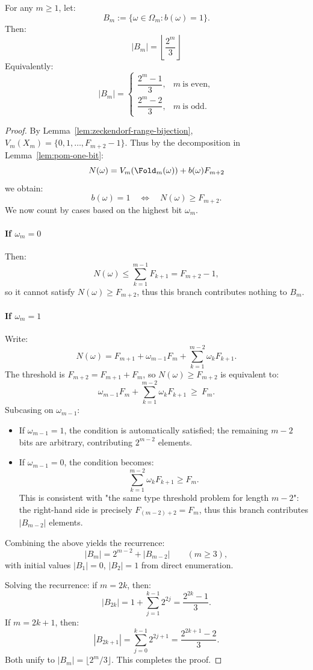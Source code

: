 \begin{theorem}\label{thm:pom-hidden-bit-count}
For any $m\ge 1$, let:
\[
B_m:=\{\omega\in\Omega_m: b(\omega)=1\}.
\]
Then:
$$
\boxed{\ |B_m|=\left\lfloor \frac{2^m}{3}\right\rfloor\ }
$$
Equivalently:
$$
|B_m|=
\begin{cases}
\dfrac{2^m-1}{3}, & m\ \text{is even},\\[6pt]
\dfrac{2^m-2}{3}, & m\ \text{is odd}.
\end{cases}
$$
\end{theorem}
\begin{proof}
By Lemma~\ref{lem:zeckendorf-range-bijection}, $V_m(X_m)=\{0,1,\dots,F_{m+2}-1\}$. Thus by the decomposition in Lemma~\ref{lem:pom-one-bit}:
$$
N(\omega)=V_m(\Fold_m(\omega))+b(\omega)F_{m+2}
$$
we obtain:
$$
b(\omega)=1\quad\Longleftrightarrow\quad N(\omega)\ge F_{m+2}.
$$
We now count by cases based on the highest bit $\omega_m$.

\paragraph{If $\omega_m=0$}
Then:
$$
N(\omega)\le \sum_{k=1}^{m-1}F_{k+1}=F_{m+2}-1,
$$
so it cannot satisfy $N(\omega)\ge F_{m+2}$, thus this branch contributes nothing to $B_m$.

\paragraph{If $\omega_m=1$}
Write:
$$
N(\omega)=F_{m+1}+\omega_{m-1}F_m+\sum_{k=1}^{m-2}\omega_kF_{k+1}.
$$
The threshold is $F_{m+2}=F_{m+1}+F_m$, so $N(\omega)\ge F_{m+2}$ is equivalent to:
$$
\omega_{m-1}F_m+\sum_{k=1}^{m-2}\omega_kF_{k+1}\ \ge\ F_m.
$$
Subcasing on $\omega_{m-1}$:
\begin{itemize}
  \item If $\omega_{m-1}=1$, the condition is automatically satisfied; the remaining $m-2$ bits are arbitrary, contributing $2^{m-2}$ elements.
  \item If $\omega_{m-1}=0$, the condition becomes:
  $$
  \sum_{k=1}^{m-2}\omega_kF_{k+1}\ge F_m.
  $$
  This is consistent with "the same type threshold problem for length $m-2$": the right-hand side is precisely $F_{(m-2)+2}=F_m$, thus this branch contributes $|B_{m-2}|$ elements.
\end{itemize}
Combining the above yields the recurrence:
$$
|B_m|=2^{m-2}+|B_{m-2}|\qquad(m\ge 3),
$$
with initial values $|B_1|=0$, $|B_2|=1$ from direct enumeration.

Solving the recurrence: if $m=2k$, then:
$$
|B_{2k}|=1+\sum_{j=1}^{k-1}2^{2j}=\frac{2^{2k}-1}{3}.
$$
If $m=2k+1$, then:
$$
|B_{2k+1}|=\sum_{j=0}^{k-1}2^{2j+1}=\frac{2^{2k+1}-2}{3}.
$$
Both unify to $|B_m|=\lfloor 2^m/3\rfloor$. This completes the proof.
\end{proof}

